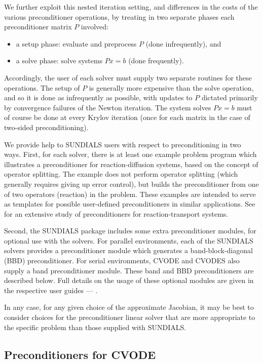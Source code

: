 We further exploit this nested iteration setting, and differences in
the costs of the various preconditioner operations, by treating in two
separate phases each preconditioner matrix $P$ involved:
\begin{itemize}
\item a setup phase: evaluate and preprocess $P$ (done infrequently), and
\item a solve phase: solve systems $Px = b$ (done frequently).
\end{itemize}
Accordingly, the user of each solver must supply two separate
routines for these operations.  The setup of $P$ is generally more
expensive than the solve operation, and so it is done as infrequently
as possible, with updates to $P$ dictated primarily by convergence
failures of the Newton iteration.  The system solves $Px = b$ must of
course be done at every Krylov iteration (once for each matrix in
the case of two-sided preconditioning).

We provide help to SUNDIALS users with respect to preconditioning in
two ways.  First, for each solver, there is at least one example
problem program which illustrates a preconditioner for
reaction-diffusion systems, based on the concept of operator
splitting.  The example does not perform operator splitting (which
generally requires giving up error control), but builds the
preconditioner from one of two operators (reaction) in the problem.
These examples are intended to serve as templates for possible
user-defined preconditioners in similar applications.  See
\cite{BrHi:89} for an extensive study of preconditioners for
reaction-transport systems.

Second, the SUNDIALS package includes some extra preconditioner
modules, for optional use with the solvers.  For parallel environments,
each of the SUNDIALS solvers provides a preconditioner module which
generates a band-block-diagonal (BBD) preconditioner.  For serial
environments, CVODE and CVODES also supply a band preconditioner module.
These band and BBD preconditioners are described below.  Full details on the
usage of these optional modules are given in the respective user
guides --- \cite{HiSe:04cvode,HiSe:04cvodes,HSW:04kinsol,HiSe:04ida}.

In any case, for any given choice of the approximate Jacobian, it may
be best to consider choices for the preconditioner linear solver that
are more appropriate to the specific problem than those supplied with
SUNDIALS.

\subsection{Preconditioners for CVODE}


